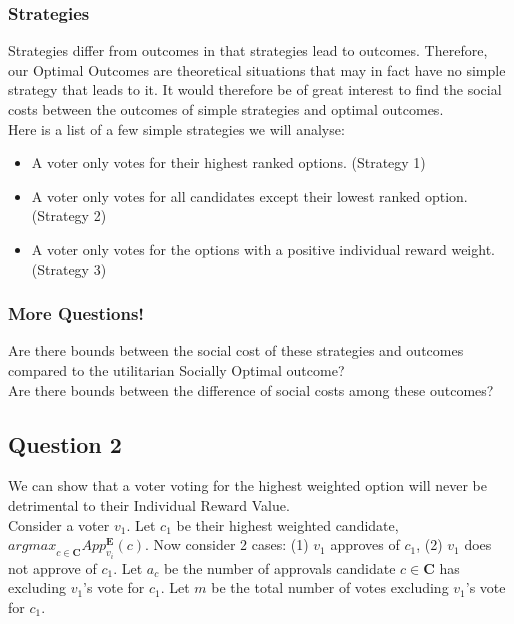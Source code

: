 \documentclass{article}
\begin{document}
\subsubsection{Strategies}

Strategies differ from outcomes in that strategies lead to outcomes. Therefore, our Optimal Outcomes are theoretical situations that may in fact have no simple strategy that leads to it. It would therefore be of great interest to find the social costs between the outcomes of simple strategies and optimal outcomes.\\

\noindent Here is a list of a few simple strategies we will analyse:
\begin{itemize}
  \item A voter only votes for their highest ranked options. (Strategy 1)
  \item A voter only votes for all candidates except their lowest ranked option. (Strategy 2)
  \item A voter only votes for the options with a positive individual reward weight. (Strategy 3)
\end{itemize}

\subsubsection{More Questions!}

Are there bounds between the social cost of these strategies and outcomes compared to the utilitarian Socially Optimal outcome?\\
Are there bounds between the difference of social costs among these outcomes?

\subsection{Question 2}
We can show that a voter voting for the highest weighted option will never be detrimental to their Individual Reward Value.\\

Consider a voter $v_{1}$. Let $c_{1}$ be their highest weighted candidate, ${argmax}_{c \in \boldsymbol{C}}App^{\boldsymbol{E}}_{v_{i}}(c)$. Now consider 2 cases: (1) $v_{1}$ approves of $c_{1}$, (2) $v_{1}$ does not approve of $c_{1}$. Let $a_{c}$ be the number of approvals candidate $c \in \boldsymbol{C}$ has excluding $v_{1}$'s vote for $c_{1}$. Let $m$ be the total number of votes excluding $v_{1}$'s vote for $c_{1}$.\\
\end{document}

